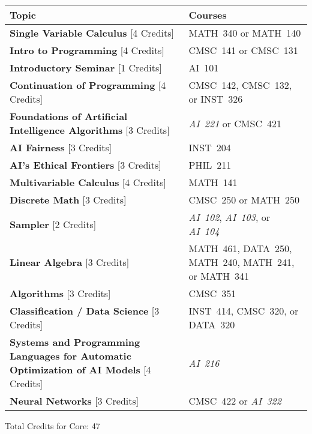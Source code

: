 \begin{longtable}{p{7cm}>{\raggedleft\arraybackslash}p{7cm}}
Topic & Courses \\
\toprule
\textbf{Single Variable Calculus} [4 Credits] & MATH~340 or MATH~140       \\
\textbf{Intro to Programming} [4 Credits] & CMSC~141 or CMSC~131           \\
\textbf{Introductory Seminar} [1 Credits] & AI~101                         \\
\textbf{Continuation of Programming} [4 Credits] & CMSC~142, CMSC~132, or INST~326 \\
\textbf{Foundations of Artificial Intelligence Algorithms} [3 Credits] & \textit{AI~221} or CMSC~421 \\
\textbf{AI Fairness} [3 Credits] & INST~204                                \\
\textbf{AI's Ethical Frontiers} [3 Credits] & PHIL~211                     \\
\textbf{Multivariable Calculus} [4 Credits] & MATH~141                     \\
\textbf{Discrete Math} [3 Credits] & CMSC~250 or MATH~250                  \\
\textbf{Sampler} [2 Credits] & \textit{AI~102}, \textit{AI~103}, or \textit{AI~104} \\
\textbf{Linear Algebra} [3 Credits] & MATH~461, DATA~250, MATH~240, MATH~241, or MATH~341 \\
\textbf{Algorithms} [3 Credits] & CMSC~351                                 \\
\textbf{Classification / Data Science} [3 Credits] & INST~414, CMSC~320, or DATA~320 \\
\textbf{Systems and Programming Languages for Automatic Optimization of AI Models} [4 Credits] & \textit{AI~216} \\
\textbf{Neural Networks} [3 Credits] & CMSC~422 or \textit{AI~322}         \\
\bottomrule
\end{longtable}
Total Credits for Core: 47
